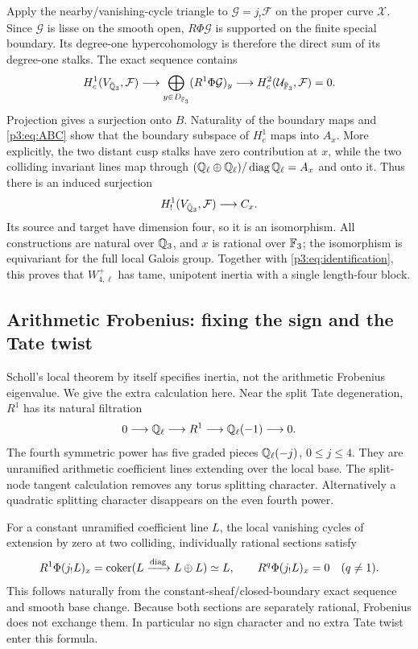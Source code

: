 Apply the nearby/vanishing-cycle triangle to $\mathcal G=j_!\mathcal F$
on the proper curve $\mathcal X$. Since $\mathcal G$ is lisse on the smooth
open, $R\Phi\mathcal G$ is supported on the finite special boundary.
Its degree-one hypercohomology is therefore the direct sum of its
degree-one stalks. The exact sequence contains
\[
 H_c^1(V_{\bar{\mathbb Q}_3},\mathcal F)\longrightarrow
 \bigoplus_{y\in D_{\bar{\mathbb F}_3}}(R^1\Phi\mathcal G)_y
 \longrightarrow H_c^2(\mathcal U_{\bar{\mathbb F}_3},\mathcal F)=0.
\]
Projection gives a surjection onto $B$. Naturality of the boundary maps
and \eqref{p3:eq:ABC} show that the boundary subspace of $H_c^1$ maps into
$A_x$. More explicitly, the two distant cusp stalks have zero contribution
at $x$, while the two colliding invariant lines map through
$(\mathbb Q_\ell\oplus\mathbb Q_\ell)/\operatorname{diag}\mathbb Q_\ell=A_x$ and onto it.
Thus there is an induced
surjection
\[
 H^1_!(V_{\bar{\mathbb Q}_3},\mathcal F)\longrightarrow C_x.
\]
Its source and target have dimension four, so it is an isomorphism.
All constructions are natural over $\mathbb Q_3$, and $x$ is rational over $\mathbb F_3$;
the isomorphism is equivariant for the full local Galois group.
Together with \eqref{p3:eq:identification}, this proves that $W_{4,\ell}^{+}$
has tame, unipotent inertia with a single length-four block.

\subsection{Arithmetic Frobenius: fixing the sign and the Tate twist}
Scholl's local theorem by itself specifies inertia, not the arithmetic
Frobenius eigenvalue. We give the extra calculation here.
Near the split Tate degeneration, $R^1$ has its natural filtration
\[
 0\longrightarrow\mathbb Q_\ell\longrightarrow R^1
 \longrightarrow\mathbb Q_\ell(-1)\longrightarrow0.
\]
The fourth symmetric power has five graded pieces
$\mathbb Q_\ell(-j)$, $0\le j\le4$.
They are unramified arithmetic coefficient lines extending over the local
base. The split-node tangent calculation removes any torus splitting
character. Alternatively a quadratic splitting character disappears on
the even fourth power.

For a constant unramified coefficient line $L$, the local vanishing cycles
of extension by zero at two colliding, individually rational sections satisfy
\[
 R^1\Phi(j_!L)_x=\operatorname{coker}(L\xrightarrow{\rm diag}L\oplus L)
 \simeq L,\qquad R^q\Phi(j_!L)_x=0\quad(q\ne1).
\]
This follows naturally from the constant-sheaf/closed-boundary exact
sequence and smooth base change. Because both sections are separately
rational, Frobenius does not exchange them. In particular no sign
character and no extra Tate twist enter this formula.


